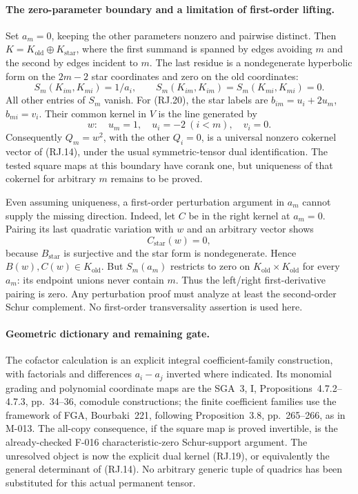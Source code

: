\paragraph{The zero-parameter boundary and a limitation of first-order lifting.}
Set \(a_m=0\), keeping the other parameters nonzero
and pairwise distinct.
Then \(K=K_{\mathrm{old}}\oplus K_{\mathrm{star}}\),
where the first summand is spanned by edges avoiding
\(m\) and the second by edges incident to \(m\).
The last residue is a nondegenerate hyperbolic form
on the \(2m-2\) star coordinates and zero on the old
coordinates:
\[
 S_m(K_{im},K_{mi})=1/a_i,\qquad
 S_m(K_{im},K_{im})=S_m(K_{mi},K_{mi})=0 .
                                                               \tag{RJ.21}
\]
All other entries of \(S_m\) vanish.
For (RJ.20), the star labels are
\(b_{im}=u_i+2u_m\), \(b_{mi}=v_i\).
Their common kernel in \(V\) is the line generated by
\[
        w:\quad u_m=1,\quad u_i=-2\ (i<m),\quad v_i=0.
                                                               \tag{RJ.22}
\]
Consequently \(Q_m=w^2\), with the other \(Q_i=0\),
is a universal nonzero cokernel vector of (RJ.14),
under the usual symmetric-tensor dual identification.
The tested square maps at this boundary have corank one,
but uniqueness of that cokernel for arbitrary \(m\)
remains to be proved.

Even assuming uniqueness, a first-order perturbation
argument in \(a_m\) cannot supply the missing direction.
Indeed, let \(C\) be in the right kernel at \(a_m=0\).
Pairing its last quadratic variation with \(w\) and
an arbitrary vector shows
\[
                         C_{\mathrm{star}}(w)=0,
\]
because \(B_{\mathrm{star}}\) is surjective and the
star form is nondegenerate.
Hence \(B(w),C(w)\in K_{\mathrm{old}}\).
But \(S_m(a_m)\) restricts to zero on
\(K_{\mathrm{old}}\times K_{\mathrm{old}}\) for
every \(a_m\): its endpoint unions never contain \(m\).
Thus the left/right first-derivative pairing is zero.
Any perturbation proof must analyze at least the
second-order Schur complement. No first-order
transversality assertion is used here.

\paragraph{Geometric dictionary and remaining gate.}
The cofactor calculation is an explicit integral
coefficient-family construction, with factorials and
differences \(a_i-a_j\) inverted where indicated.
Its monomial grading and polynomial coordinate maps
are the SGA~3, I, Propositions~4.7.2--4.7.3,
pp.~34--36, comodule constructions; the finite
coefficient families use the framework of FGA,
Bourbaki~221, following Proposition~3.8,
pp.~265--266, as in M-013.
The all-copy consequence, if the square map is proved
invertible, is the already-checked F-016
characteristic-zero Schur-support argument.
The unresolved object is now the explicit dual kernel
(RJ.19), or equivalently the general determinant of
(RJ.14). No arbitrary generic tuple of quadrics has
been substituted for this actual permanent tensor.
